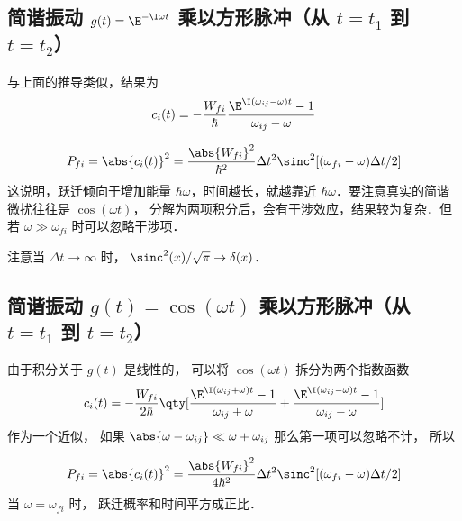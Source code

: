 \subsection{简谐振动 $g(t)= \E^{-\I\omega t}$ 乘以方形脉冲（从 $t=t_1$ 到 $t=t_2$）}
与上面的推导类似，结果为
\begin{equation}
c_i(t) = -\frac{W_{fi}}{\hbar} \frac{\E^{\I(\omega_{ij} - \omega)t} - 1}{\omega_{ij} - \omega}
\end{equation}

\begin{equation}
P_{fi} = \abs{c_i(t)}^2 = \frac{\abs{W_{fi}}^2}{\hbar^2} \Delta t^2 \sinc^2[(\omega_{fi}-\omega)\Delta t/2]
\end{equation}
这说明，跃迁倾向于增加能量 $\hbar\omega$，时间越长，就越靠近 $\hbar\omega$．要注意真实的简谐微扰往往是 $\cos(\omega t)$， 分解为两项积分后，会有干涉效应，结果较为复杂．但若 $\omega \gg \omega_{fi}$ 时可以忽略干涉项．

注意当 $\Delta t \to \infty$ 时， $\sinc^2(x)/\sqrt{\pi} \to \delta(x)$．

\subsection{简谐振动 $g(t)= \cos(\omega t)$ 乘以方形脉冲（从 $t=t_1$ 到 $t=t_2$）}
由于积分关于 $g(t)$ 是线性的， 可以将 $\cos(\omega t)$ 拆分为两个指数函数
\begin{equation}
c_i(t) = -\frac{W_{fi}}{2\hbar} \qty[\frac{\E^{\I(\omega_{ij} + \omega)t} - 1}{\omega_{ij} + \omega} + \frac{\E^{\I(\omega_{ij} - \omega)t} - 1}{\omega_{ij} - \omega}]
\end{equation}
作为一个近似， 如果 $\abs{\omega - \omega_{ij}} \ll \omega + \omega_{ij}$ 那么第一项可以忽略不计， 所以

\begin{equation}
P_{fi} = \abs{c_i(t)}^2 = \frac{\abs{W_{fi}}^2}{4\hbar^2} \Delta t^2 \sinc^2[(\omega_{fi}-\omega)\Delta t/2]
\end{equation}
当 $\omega = \omega_{fi}$ 时， 跃迁概率和时间平方成正比．
